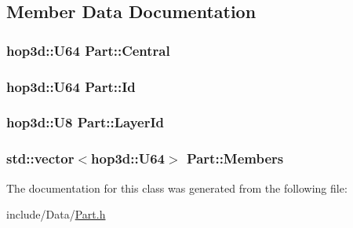 \subsection{Member Data Documentation}
\hypertarget{class_part_a1dafacbc907066c3976ca09dc69a7421}{
\subsubsection[{Central}]{\setlength{\rightskip}{0pt plus 5cm}hop3d\-::\-U64 Part\-::\-Central\hspace{0.3cm}{\ttfamily [protected]}}}\label{class_part_a1dafacbc907066c3976ca09dc69a7421}
\hypertarget{class_part_a3d19e990ee30d25cd5f12610864300db}{
\subsubsection[{Id}]{\setlength{\rightskip}{0pt plus 5cm}hop3d\-::\-U64 Part\-::\-Id\hspace{0.3cm}{\ttfamily [protected]}}}\label{class_part_a3d19e990ee30d25cd5f12610864300db}
\hypertarget{class_part_ac4e9f24ead3926518a74b37c5101efc0}{
\subsubsection[{Layer\-Id}]{\setlength{\rightskip}{0pt plus 5cm}hop3d\-::\-U8 Part\-::\-Layer\-Id\hspace{0.3cm}{\ttfamily [protected]}}}\label{class_part_ac4e9f24ead3926518a74b37c5101efc0}
\hypertarget{class_part_ad5e3891ace1e60c4b0c9b86bad225a38}{
\subsubsection[{Members}]{\setlength{\rightskip}{0pt plus 5cm}std\-::vector$<$hop3d\-::\-U64$>$ Part\-::\-Members\hspace{0.3cm}{\ttfamily [protected]}}}\label{class_part_ad5e3891ace1e60c4b0c9b86bad225a38}


The documentation for this class was generated from the following file\-:\begin{DoxyCompactItemize}
\item 
include/\-Data/\hyperlink{_part_8h}{Part.\-h}\end{DoxyCompactItemize}
